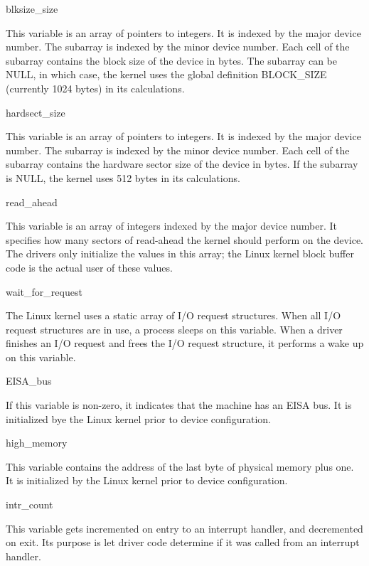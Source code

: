 \begin{icsymlist}
\item[blksize_size]

This variable is an array of pointers to integers.  It is indexed by
the major device number.  The subarray is indexed by the minor device
number.  Each cell of the subarray contains the block size of the
device in bytes.  The subarray can be NULL, in which case, the kernel
uses the global definition BLOCK_SIZE (currently 1024 bytes) in its
calculations.

\item[hardsect_size]

This variable is an array of pointers to integers.  It is indexed by
the major device number.  The subarray is indexed by the minor device
number.  Each cell of the subarray contains the hardware sector size of the
device in bytes.  If the subarray is NULL, the kernel uses 512 bytes
in its calculations.

\item[read_ahead]

This variable is an array of integers indexed by the major device
number.  It specifies how many sectors of read-ahead the kernel should
perform on the device.  The drivers only initialize the values in this
array; the Linux kernel block buffer code is the actual user of these
values.

\item[wait_for_request]

The Linux kernel uses a static array of I/O request structures.  When
all I/O request structures are in use, a process sleeps on this
variable.  When a driver finishes an I/O request and frees the I/O
request structure, it performs a wake up on this variable.

\item[EISA_bus]

If this variable is non-zero, it indicates that the machine has an
EISA bus.  It is initialized bye the Linux kernel prior to device
configuration.

\item[high_memory]

This variable contains the address of the last byte of physical memory
plus one.  It is initialized by the Linux kernel prior to device
configuration.

\item[intr_count]

This variable gets incremented on entry to an interrupt handler,
and decremented on exit.  Its purpose is let driver code determine if it
was called from an interrupt handler.


\end{icsymlist}
